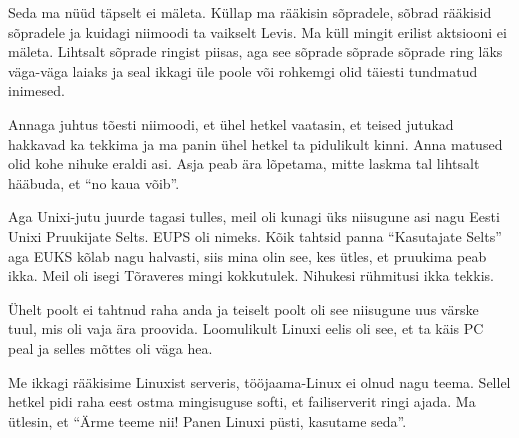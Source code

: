 
Seda ma nüüd täpselt ei mäleta. Küllap ma rääkisin sõpradele,  sõbrad rääkisid sõpradele ja kuidagi niimoodi ta vaikselt Levis. Ma küll mingit erilist aktsiooni ei mäleta. Lihtsalt sõprade ringist piisas, aga see sõprade sõprade sõprade ring läks väga-väga laiaks ja seal ikkagi üle poole või rohkemgi olid täiesti tundmatud inimesed. 

Annaga juhtus tõesti niimoodi, et ühel hetkel vaatasin, et teised jutukad hakkavad ka tekkima ja ma panin ühel hetkel ta pidulikult kinni. Anna matused olid kohe nihuke eraldi asi. Asja peab ära lõpetama, mitte laskma tal lihtsalt hääbuda, et \enquote{no kaua võib}. 

Aga Unixi-jutu  juurde tagasi tulles,  meil oli kunagi üks niisugune asi nagu Eesti Unixi Pruukijate Selts. EUPS oli nimeks. Kõik  tahtsid panna \enquote{Kasutajate Selts} aga EUKS kõlab nagu halvasti, siis mina olin see, kes ütles, et pruukima peab ikka. Meil oli isegi Tõraveres mingi kokkutulek. Nihukesi rühmitusi ikka tekkis.


Ühelt poolt ei tahtnud raha anda ja teiselt poolt oli see niisugune uus värske tuul, mis oli vaja ära proovida. Loomulikult Linuxi eelis oli see, et ta käis PC peal  ja  selles mõttes oli väga hea. 


Me ikkagi rääkisime Linuxist serveris, tööjaama-Linux ei olnud nagu teema. Sellel hetkel pidi raha eest ostma mingisuguse softi, et failiserverit ringi ajada. Ma ütlesin, et \enquote{Ärme teeme nii! Panen Linuxi püsti, kasutame seda}. 


